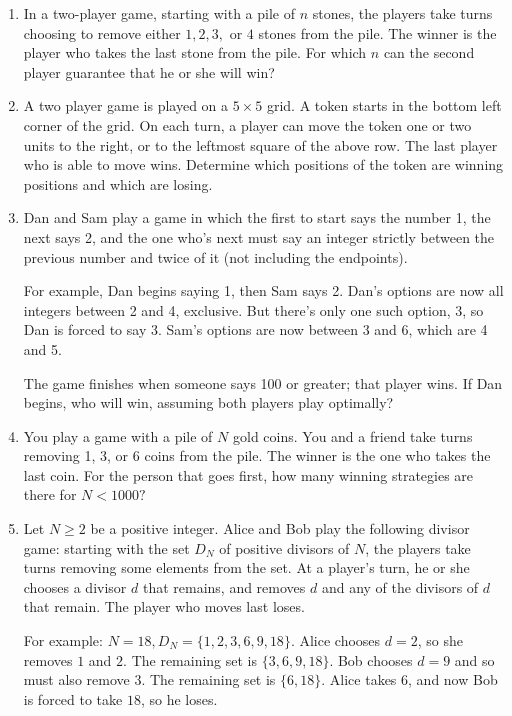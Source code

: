 \documentclass[12pt]{scrartcl}
\begin{document}
\begin{enumerate}[resume]
    \item In a two-player game, starting with a pile of $ n $ stones, the players take turns choosing to remove either $ 1,2,3, $ or $ 4 $ stones from the pile. The winner is the player who takes the last stone from the pile. For which $ n $ can the second player guarantee that he or she will win?

    \item A two player game is played on a $5 \times 5$ grid. A token starts in the bottom left corner of the grid. On each turn, a player can move the token one or two units to the right, or to the leftmost square of the above row. The last player who is able to move wins. Determine which positions of the token are winning positions and which are losing.

    \item Dan and Sam play a game in which the first to start says the number 1, the next says 2, and the one who's next must say an integer strictly between the previous number and twice of it (not including the endpoints).
    
    For example, Dan begins saying 1, then Sam says 2. Dan's options are now all integers between 2 and 4, exclusive. But there's only one such option, 3, so Dan is forced to say 3. Sam's options are now between 3 and 6, which are 4 and 5.
    
    The game finishes when someone says 100 or greater; that player wins. If Dan begins, who will win, assuming both players play optimally?


    \item You play a game with a pile of $N$ gold coins. You and a friend take turns removing 1, 3, or 6 coins from the pile. The winner is the one who takes the last coin. For the person that goes first, how many winning strategies are there for $N < 1000?$

    \item Let $ N \ge 2 $ be a positive integer. Alice and Bob play the following divisor game: starting with the set $ D_N $ of positive divisors of $ N$, the players take turns removing some elements from the set. At a player's turn, he or she chooses a divisor $ d $ that remains, and removes $ d $ and any of the divisors of $ d $ that remain. The player who moves last loses.
    
    For example: $ N = 18, D_N = \{ 1,2,3,6,9,18 \} $. Alice chooses $ d=2 $, so she removes $ 1 $ and $ 2 $. The remaining set is $ \{3,6,9,18\} $. Bob chooses $ d = 9 $ and so must also remove $ 3 $. The remaining set is $ \{6,18\} $. Alice takes $ 6 $, and now Bob is forced to take $ 18 $, so he loses.


\end{enumerate}
\end{document}
